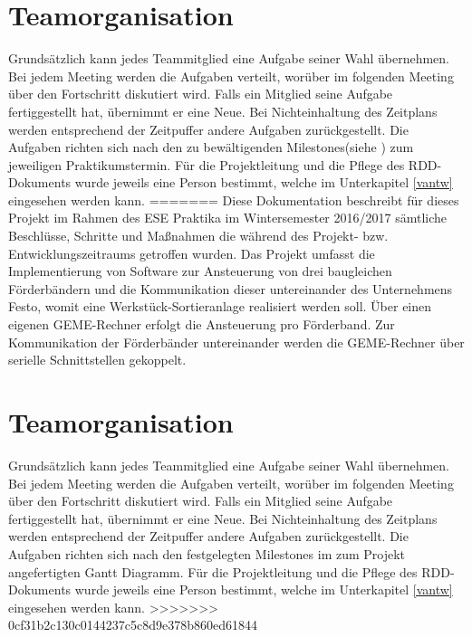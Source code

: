 \documentclass[a4paper, 11pt]{article}
\begin{document}
\section{Teamorganisation}
Grundsätzlich kann jedes Teammitglied eine Aufgabe seiner Wahl übernehmen. Bei jedem Meeting werden die Aufgaben verteilt, worüber im folgenden Meeting über den Fortschritt diskutiert wird. Falls ein Mitglied seine Aufgabe fertiggestellt hat, übernimmt er eine Neue. Bei Nichteinhaltung des Zeitplans werden entsprechend der Zeitpuffer andere Aufgaben zurückgestellt. Die Aufgaben richten sich nach den zu bewältigenden Milestones(siehe \cite{esep}) zum jeweiligen Praktikumstermin. Für die Projektleitung und die Pflege des RDD-Dokuments wurde jeweils eine Person bestimmt, welche im Unterkapitel \ref{vantw} eingesehen werden kann.
=======
Diese Dokumentation beschreibt für dieses Projekt im Rahmen des ESE Praktika im Wintersemester 2016/2017 sämtliche Beschlüsse, Schritte und Maßnahmen die während des Projekt- bzw. Entwicklungszeitraums getroffen wurden. Das Projekt umfasst die Implementierung von Software zur Ansteuerung von drei baugleichen Förderbändern und die Kommunikation dieser untereinander des Unternehmens Festo, womit eine Werkstück-Sortieranlage realisiert werden soll. Über einen eigenen GEME-Rechner erfolgt die Ansteuerung pro Förderband. Zur Kommunikation der Förderbänder untereinander werden die GEME-Rechner über serielle Schnittstellen gekoppelt.

\section{Teamorganisation}
Grundsätzlich kann jedes Teammitglied eine Aufgabe seiner Wahl übernehmen. Bei jedem Meeting werden die Aufgaben verteilt, worüber im folgenden Meeting über den Fortschritt diskutiert wird. Falls ein Mitglied seine Aufgabe fertiggestellt hat, übernimmt er eine Neue. Bei Nichteinhaltung des Zeitplans werden entsprechend der Zeitpuffer andere Aufgaben zurückgestellt. Die Aufgaben richten sich nach den festgelegten Milestones im zum Projekt angefertigten Gantt Diagramm. Für die Projektleitung und die Pflege des RDD-Dokuments wurde jeweils eine Person bestimmt, welche im Unterkapitel \ref{vantw} eingesehen werden kann.
>>>>>>> 0cf31b2c130c0144237c5c8d9e378b860ed61844
\end{document}
